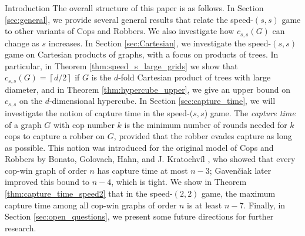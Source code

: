 \documentclass[12pt]{amsart}
\newcommand{\comment}[1]{\textcolor{red}{#1}}
\theoremstyle{definition}
\newcommand{\speeds}{c_{s,s}}
\begin{document}
\begin{section}{Introduction}
The overall structure of this paper is as follows.  In Section \ref{sec:general}, we provide several general results that relate the speed-$(s,s)$ game to other variants of Cops and Robbers.  We also investigate how $\speeds(G)$ can change as $s$ increases.
In Section \ref{sec:Cartesian}, we investigate the speed-$(s,s)$ game on Cartesian products of graphs, with a focus on products of trees.  In particular, in Theorem \ref{thm:speed_s_large_grids} we show that $c_{s,s}(G)=\left\lceil d/2\right\rceil$ if $G$ is the $d$-fold Cartesian product of trees with large diameter, and in Theorem \ref{thm:hypercube_upper}, we give an upper bound on $\speeds$ on the $d$-dimensional hypercube.  
In Section \ref{sec:capture_time}, we will investigate the notion of capture time in the speed-$(s,s$) game.  The \textit{capture time} of a graph $G$ with cop number $k$ is the minimum number of rounds needed for $k$ cops to capture a robber on $G$, provided that the robber evades capture as long as possible.  This notion was introduced for the original model of Cops and Robbers by Bonato, Golovach, Hahn, and J. Kratochv\'{i}l \cite{BGHK09}, who showed that every cop-win graph of order $n$ has capture time at most $n-3$; Gaven\v{c}iak \cite{Gav10} later improved this bound to $n-4$, which is tight.  We show in Theorem \ref{thm:capture_time_speed2} that in the speed-$(2,2)$ game, the maximum capture time among all cop-win graphs of order $n$ is at least $n-7$. Finally, in Section \ref{sec:open_questions}, we present some future directions for further research.



\end{section}
\end{document}

